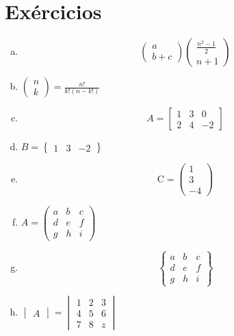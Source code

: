 \documentclass[a4paper, 11pt]{article}
\begin{document}
\section{Exércicios}

\begin{enumerate}[a.]
	\item
	\[ 
		\begin{pmatrix}
			a \\
			b + c
		\end{pmatrix}
		\begin{pmatrix}
			\frac{n^{2}-1}{2} \\
			n + 1
		\end{pmatrix}
	\]

	\item
	$
		\begin{pmatrix}
			n \\
			k
		\end{pmatrix}
		=
		\frac{n!}{k!(n - k!)}
	$

	\item \[
		A = \begin{bmatrix}
				1 & 3 & 0 \\
				2 & 4 & -2
			\end{bmatrix}
		\]	

	\item $
			B = \begin{Bmatrix}
				1 & 3 & -2
			\end{Bmatrix}
		  $

	\item \[ 
			\mathrm{C}=\begin{pmatrix}
						1 \\
						3 \\
						-4
					\end{pmatrix}
		  \]


	\item $
			A = \begin{pmatrix}
				a & b & c \\
				d & e & f \\
				g & h & i
			\end{pmatrix}
		$

	\item \[ 
			\begin{Bmatrix}
				a & b & c \\
				d & e & f \\
				g & h & i
			\end{Bmatrix}
		  \]

	\item $
		\begin{vmatrix} A \end{vmatrix} = \begin{vmatrix}
											1 & 2 & 3 \\
											4 & 5 & 6 \\
											7 & 8 & z
										  \end{vmatrix}
		 $
	

\end{enumerate}
\end{document}
